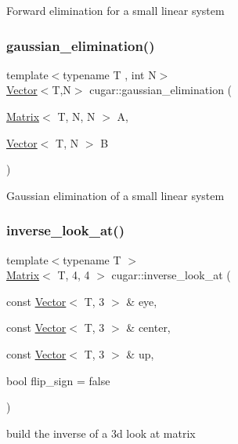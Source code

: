 Forward elimination for a small linear system \mbox{\label{group___matrices_module_ga00891ffdf015baf5d6f88d07319fe75f}} 
\subsubsection{\texorpdfstring{gaussian\+\_\+elimination()}{gaussian\_elimination()}}
{\footnotesize\ttfamily template$<$typename T , int N$>$ \\
\hyperlink{structcugar_1_1_vector}{Vector}$<$T,N$>$ cugar\+::gaussian\+\_\+elimination (\begin{DoxyParamCaption}\item[{\hyperlink{structcugar_1_1_matrix}{Matrix}$<$ T, N, N $>$}]{A,  }\item[{\hyperlink{structcugar_1_1_vector}{Vector}$<$ T, N $>$}]{B }\end{DoxyParamCaption})}

Gaussian elimination of a small linear system \mbox{\label{group___matrices_module_gac14726d6904fc9bad43cf33757e9fcaa}} 
\subsubsection{\texorpdfstring{inverse\+\_\+look\+\_\+at()}{inverse\_look\_at()}}
{\footnotesize\ttfamily template$<$typename T $>$ \\
\hyperlink{structcugar_1_1_matrix}{Matrix}$<$ T, 4, 4 $>$ cugar\+::inverse\+\_\+look\+\_\+at (\begin{DoxyParamCaption}\item[{const \hyperlink{structcugar_1_1_vector}{Vector}$<$ T, 3 $>$ \&}]{eye,  }\item[{const \hyperlink{structcugar_1_1_vector}{Vector}$<$ T, 3 $>$ \&}]{center,  }\item[{const \hyperlink{structcugar_1_1_vector}{Vector}$<$ T, 3 $>$ \&}]{up,  }\item[{bool}]{flip\+\_\+sign = {\ttfamily false} }\end{DoxyParamCaption})}

build the inverse of a 3d look at matrix \mbox{\label{group___matrices_module_gac6ae11f2364374a0f668719e4aa2e125}} 
